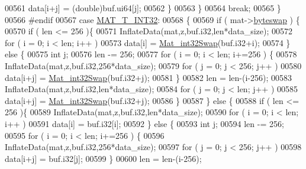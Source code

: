 \begin{DoxyCode}
00561                         data[i+j] = (\textcolor{keywordtype}{double})buf.ui64[j];
00562                 \}
00563             \}
00564             \textcolor{keywordflow}{break};
00565         \}
00566 \textcolor{preprocessor}{#endif}
00567         \textcolor{keywordflow}{case} \hyperlink{group___m_a_t_ggacf7b3b879282b7ab3a51190e49bf3453a83e06a68320726c6572bfbb9f3addb1d}{MAT\_T\_INT32}:
00568         \{
00569             \textcolor{keywordflow}{if} ( mat->\hyperlink{struct__mat__t_a99d207977af5e04941ace56d71817a40}{byteswap} ) \{
00570                 \textcolor{keywordflow}{if} ( len <= 256 )\{
00571                     InflateData(mat,z,buf.i32,len*data\_size);
00572                     \textcolor{keywordflow}{for} ( i = 0; i < len; i++ )
00573                         data[i] = \hyperlink{endian_8c_a2e0153996243f0a34df9a5286087cfa3}{Mat\_int32Swap}(buf.i32+i);
00574                 \} \textcolor{keywordflow}{else} \{
00575                     \textcolor{keywordtype}{int} j;
00576                     len -= 256;
00577                     \textcolor{keywordflow}{for} ( i = 0; i < len; i+=256 ) \{
00578                         InflateData(mat,z,buf.i32,256*data\_size);
00579                         \textcolor{keywordflow}{for} ( j = 0; j < 256; j++ )
00580                             data[i+j] = \hyperlink{endian_8c_a2e0153996243f0a34df9a5286087cfa3}{Mat\_int32Swap}(buf.i32+j);
00581                     \}
00582                     len = len-(i-256);
00583                     InflateData(mat,z,buf.i32,len*data\_size);
00584                     \textcolor{keywordflow}{for} ( j = 0; j < len; j++ )
00585                         data[i+j] = \hyperlink{endian_8c_a2e0153996243f0a34df9a5286087cfa3}{Mat\_int32Swap}(buf.i32+j);
00586                 \}
00587             \} \textcolor{keywordflow}{else} \{
00588                 \textcolor{keywordflow}{if} ( len <= 256 )\{
00589                     InflateData(mat,z,buf.i32,len*data\_size);
00590                     \textcolor{keywordflow}{for} ( i = 0; i < len; i++ )
00591                         data[i] = buf.i32[i];
00592                 \} \textcolor{keywordflow}{else} \{
00593                     \textcolor{keywordtype}{int} j;
00594                     len -= 256;
00595                     \textcolor{keywordflow}{for} ( i = 0; i < len; i+=256 ) \{
00596                         InflateData(mat,z,buf.i32,256*data\_size);
00597                         \textcolor{keywordflow}{for} ( j = 0; j < 256; j++ )
00598                             data[i+j] = buf.i32[j];
00599                     \}
00600                     len = len-(i-256);

\end{DoxyCode}

